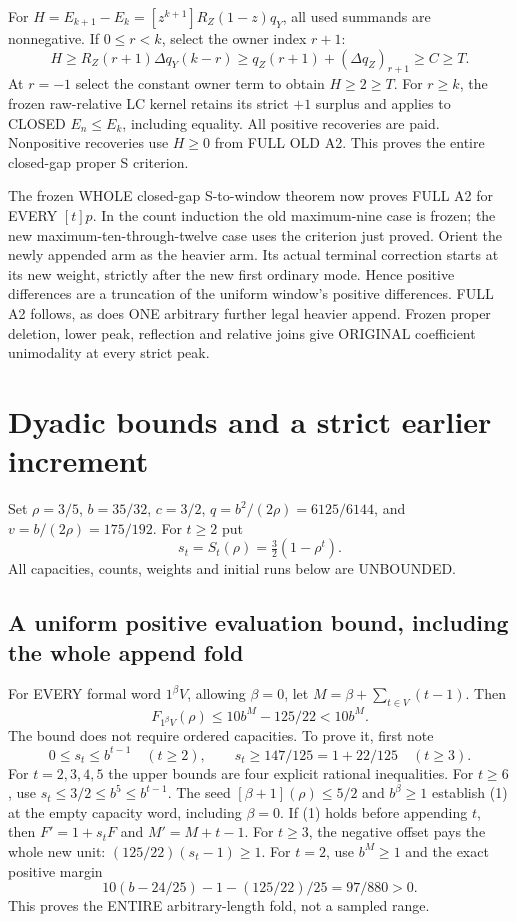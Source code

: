 \documentclass[11pt]{article}
\begin{document}
For $H=E_{k+1}-E_k=[z^{k+1}]R_Z(1-z)q_Y$, all used summands
are nonnegative. If $0\le r<k$, select the owner index $r+1$:
\[
 H\ge R_Z(r+1)\Delta q_Y(k-r)
 \ge q_Z(r+1)+(\Delta q_Z)_{r+1}\ge C\ge T.
\]
At $r=-1$ select the constant owner term to obtain $H\ge2\ge T$.
For $r\ge k$, the frozen raw-relative LC kernel retains its strict
$+1$ surplus and applies to CLOSED $E_n\le E_k$, including equality.
All positive recoveries are paid. Nonpositive recoveries use $H\ge0$
from FULL OLD A2. This proves the entire closed-gap proper S criterion.

The frozen WHOLE closed-gap S-to-window theorem now proves FULL A2 for
EVERY $[t]p$. In the count induction the old maximum-nine case is frozen;
the new maximum-ten-through-twelve case uses the criterion just proved.
Orient the newly appended arm as the heavier arm. Its actual terminal
correction starts at its new weight, strictly after the new first ordinary
mode. Hence positive differences are a truncation of the uniform window's
positive differences. FULL A2 follows, as does ONE arbitrary further
legal heavier append. Frozen proper deletion, lower peak, reflection and
relative joins give ORIGINAL coefficient unimodality at every strict peak.


\section{Dyadic bounds and a strict earlier increment}

\par\medskip

Set $\rho=3/5$, $b=35/32$, $c=3/2$, $q=b^2/(2\rho)=6125/6144$,
and $v=b/(2\rho)=175/192$. For $t\ge2$ put
\[
 s_t=S_t(\rho)=\tfrac32(1-\rho^t).
\]
All capacities, counts, weights and initial runs below are UNBOUNDED.

\subsection{A uniform positive evaluation bound, including the whole append fold}
For EVERY formal word $1^\beta V$, allowing $\beta=0$, let
$M=\beta+\sum_{t\in V}(t-1)$. Then
\[
                       F_{1^\beta V}(\rho)\le10b^M-125/22<10b^M. \tag{1}
\]
The bound does not require ordered capacities. To prove it, first note
\[
 0\le s_t\le b^{t-1}\quad(t\ge2),\qquad
 s_t\ge147/125=1+22/125\quad(t\ge3).                  \tag{2}
\]
For $t=2,3,4,5$ the upper bounds are four explicit rational inequalities.
For $t\ge6$, use $s_t\le3/2\le b^5\le b^{t-1}$.
The seed $[\beta+1](\rho)\le5/2$ and $b^\beta\ge1$ establish
(1) at the empty capacity word, including $\beta=0$.
If (1) holds before appending $t$, then $F'=1+s_tF$ and $M'=M+t-1$.
For $t\ge3$, the negative offset pays the whole new unit:
$(125/22)(s_t-1)\ge1$. For $t=2$, use $b^M\ge1$ and the exact
positive margin
\[
           10(b-24/25)-1-(125/22)/25=97/880>0.
\]
This proves the ENTIRE arbitrary-length fold, not a sampled range.
\end{document}

